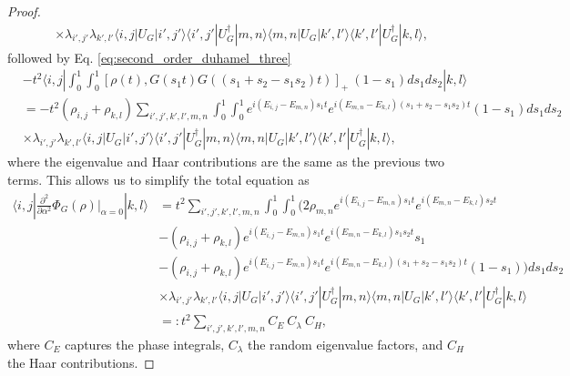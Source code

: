 \documentclass{article}
\newcommand{\ket}[1]{|#1\rangle}
\newcommand{\bra}[1]{\langle #1|}
\begin{document}
\begin{proof}
\begin{align}
    &\times \lambda_{i',j'} \lambda_{k',l'} \bra{i,j} U_G \ket{i',j'} \bra{i',j'} U_G^\dagger \ket{m,n} \bra{m,n} U_G \ket{k',l'} \bra{k',l'} U_G^\dagger \ket{k,l},
\end{align}
followed by Eq. \eqref{eq:second_order_duhamel_three}
\begin{align}
    &-t^2 \bra{i,j} \int_0^1 \int_0^1 [\rho(t), G(s_1 t) G((s_1 + s_2 - s_1 s_2) t)]_+ ~ (1- s_1) ds_1 ds_2 \ket{k,l} \\
    &= -t^2 (\rho_{i,j} + \rho_{k,l}) \sum_{i',j',k',l',m,n} \int_0^1 \int_0^1 e^{i(E_{i,j} - E_{m,n})s_1 t} e^{i(E_{m,n} - E_{k,l})(s_1 + s_2 - s_1 s_2)t} (1-s_1)ds_1 ds_2 \\
    &\times \lambda_{i',j'} \lambda_{k',l'} \bra{i,j} U_G \ket{i',j'} \bra{i',j'} U_G^\dagger \ket{m,n} \bra{m,n} U_G \ket{k',l'} \bra{k',l'} U_G^\dagger \ket{k,l},
\end{align}
where the eigenvalue and Haar contributions are the same as the previous two terms. This allows us to simplify the total equation as
\begin{align}
    \bra{i,j} \frac{\partial^2}{\partial \alpha^2} \Phi_G(\rho) \bigg|_{\alpha = 0} \ket{k,l} &= t^2 \sum_{i',j',k',l',m,n} \int_0^1 \int_0^1 \bigg(  2 \rho_{m,n} e^{i(E_{i,j} - E_{m,n})s_1t} e^{i(E_{m,n} - E_{k,l})s_2 t}  \\
    &- (\rho_{i,j} + \rho_{k,l}) e^{i(E_{i,j} - E_{m,n})s_1 t} e^{i(E_{m,n} - E_{k,l})s_1 s_2 t} s_1 \\
    &- (\rho_{i,j} + \rho_{k,l}) e^{i(E_{i,j} - E_{m,n})s_1 t} e^{i(E_{m,n} - E_{k,l})(s_1 + s_2 - s_1 s_2)t} (1-s_1) \bigg) ds_1 ds_2 \\
    &\times \lambda_{i',j'} \lambda_{k',l'} \bra{i,j} U_G \ket{i',j'} \bra{i',j'} U_G^\dagger \ket{m,n} \bra{m,n} U_G \ket{k',l'} \bra{k',l'} U_G^\dagger \ket{k,l} \\
    &=: t^2 \sum_{i',j',k',l',m,n} C_{E} ~ C_{\lambda} ~ C_{H},
\end{align}
where $C_E$ captures the phase integrals, $C_{\lambda}$ the random eigenvalue factors, and $C_{H}$ the Haar contributions. 


\end{proof}
\end{document}
